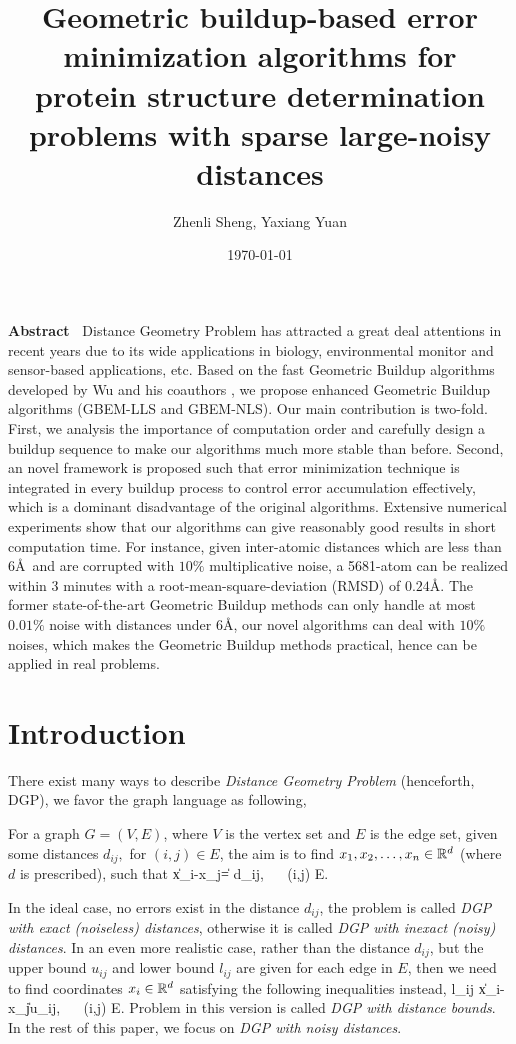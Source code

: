\documentclass[a4paper,12pt]{article}
\begin{document}
\title{Geometric buildup-based error minimization algorithms for protein structure determination problems with sparse large-noisy distances}
\author{Zhenli Sheng, Yaxiang Yuan}
\date{\today}
\maketitle

\noindent \textbf{Abstract~}  Distance Geometry Problem has attracted a great deal attentions in recent years due to its wide applications in biology, environmental monitor and sensor-based applications, etc. Based on the fast Geometric Buildup algorithms developed by Wu and his coauthors \cite{Dong2003,Wu2008,Sit2009}, we propose enhanced Geometric Buildup algorithms (GBEM-LLS and GBEM-NLS). Our main contribution is two-fold. First, we analysis the importance of computation order and carefully design a buildup sequence to make our algorithms much more stable than before. Second, an novel framework is proposed such that error minimization technique is integrated in every buildup process to control error accumulation effectively, which is a dominant disadvantage of the original algorithms. Extensive numerical experiments show that our algorithms can give reasonably good results in short computation time. For instance, given inter-atomic distances which are less than $6$\AA ~and are corrupted with $10\%$ multiplicative noise, a 5681-atom can be realized within $3$ minutes with a root-mean-square-deviation (RMSD) of $0.24$\AA. The former state-of-the-art Geometric Buildup methods \cite{Sit2009} can only handle at most $0.01\%$ noise with distances under $6$\AA, our novel algorithms can deal with $10\%$ noises, which makes the Geometric Buildup methods practical, hence can be applied in real problems.

\section{Introduction}
There exist many ways to describe \emph{Distance Geometry Problem} (henceforth, DGP), we favor the graph language as following,

For a graph $G=(V,E)$, where $V$ is the vertex set and $E$ is the edge set, given some distances $d_{ij},$ for $(i,j) \in E$, the aim is to find $x_1, x_2, \ldots, x_n \in \mathbb{R}^d$ (where $d$ is prescribed), such that
\be \|x_i-x_j\| = d_{ij}, ~~ (i,j) \in E. \ee

In the ideal case, no errors exist in the distance $d_{ij}$, the problem is called \emph{DGP with exact (noiseless) distances}, otherwise it is called \emph{DGP with inexact (noisy) distances}. In an even more realistic case, rather than the distance $d_{ij}$, but the upper bound $u_{ij}$ and lower bound $l_{ij}$ are given for each edge in $E$, then we need to find coordinates $x_i \in \mathbb{R}^d$ satisfying the following inequalities instead,
\be l_{ij} \leq \|x_i-x_j\| \leq u_{ij}, ~~ (i,j) \in E. \ee
Problem in this version is called \emph{DGP with distance bounds}. In the rest of this paper, we focus on \emph{DGP with noisy distances}.
\end{document}

